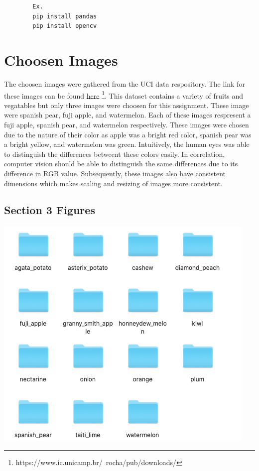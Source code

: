 \documentclass{article}
\begin{document}
\begin{multicols}{2}
\begin{center}
	\end{center}

	\begin{verbatim}
		Ex.
		pip install pandas
		pip install opencv
	\end{verbatim}
	

	

		
	

\section{Choosen Images}
The choosen images were gathered from the UCI data respository. The link for these images can be found \href{https://www.ic.unicamp.br/~rocha/pub/downloads/}{here} \footnote[1]{https://www.ic.unicamp.br/~rocha/pub/downloads/}. This dataset contains a variety of fruits and vegatables but only three images were choosen for this assignment. These image were spanish pear, fuji apple, and watermelon. Each of these images respresent a fuji apple, spanish pear,
and watermelon respectively. These images were chosen due to the nature of their color as apple was a bright red color, spanish pear was a bright yellow, and watermelon was green. Intuitively, the human eyes was able to distinguish the differences betweent these colors easily. In correlation, computer vision should be able to distinguish the same differences due to its difference in RGB value. Subsequently, these images also have consistent dimensions which makes scaling and resizing of images more consistent.


\subsection{Section 3 Figures} 
\centering
{}
\includegraphics[scale=0.3]{../screenshots/image_folder.png}


\end{multicols}
\end{document}
